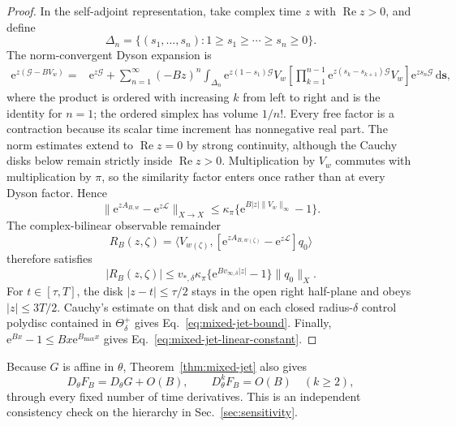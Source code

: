 \documentclass[aps,physrev,onecolumn,amsmath,amssymb,longbibliography]{revtex4-2}
\newcommand{\dd}{\mathrm d}
\newcommand{\e}{\mathrm e}
\newcommand{\Lfree}{\mathcal L}
\begin{document}
\begin{proof}
In the self-adjoint representation, take complex time \(z\) with
\(\operatorname{Re}z>0\), and define
\begin{equation}
 \Delta_n=\{(s_1,\ldots,s_n):1\ge s_1\ge\cdots\ge s_n\ge0\}.
 \label{eq:ordered-simplex}
\end{equation}
The norm-convergent Dyson expansion is
\begin{align}
 \e^{z(\mathcal G-BV_w)}
 ={}&\e^{z\mathcal G}
 +\sum_{n=1}^{\infty}(-Bz)^n
 \int_{\Delta_n}\e^{z(1-s_1)\mathcal G}V_w
 \left[\prod_{k=1}^{n-1}
 \e^{z(s_k-s_{k+1})\mathcal G}V_w\right]
 \e^{zs_n\mathcal G}\,\dd\bm s,
 \label{eq:dyson}
\end{align}
where the product is ordered with increasing \(k\) from left to right and is
the identity for \(n=1\); the ordered simplex has volume
\(1/n!\).  Every free factor is a contraction because its scalar time
increment has nonnegative real part.  The norm estimates extend to
\(\operatorname{Re}z=0\) by strong continuity, although the Cauchy disks below
remain strictly inside \(\operatorname{Re}z>0\).  Multiplication by \(V_w\)
commutes with multiplication by
\(\pi\), so the similarity factor enters once rather than at every Dyson
factor.  Hence
\begin{equation}
 \|\e^{zA_{B,w}}-\e^{z\Lfree}\|_{X\to X}
 \le\kappa_\pi\{\e^{B|z|\|V_w\|_\infty}-1\}.
 \label{eq:dyson-operator-bound}
\end{equation}
The complex-bilinear observable remainder
\begin{equation}
 R_B(z,\zeta)=
 \langle V_{w(\zeta)},
 [\e^{zA_{B,w(\zeta)}}-\e^{z\Lfree}]q_0\rangle
 \label{eq:analytic-remainder}
\end{equation}
therefore satisfies
\begin{equation}
 |R_B(z,\zeta)|
 \le v_{*,\delta}\kappa_\pi
 \{\e^{Bv_{\infty,\delta}|z|}-1\}\|q_0\|_X.
 \label{eq:analytic-remainder-bound}
\end{equation}
For \(t\in[\tau,T]\), the disk \(|z-t|\le\tau/2\) stays in the open right
half-plane and obeys \(|z|\le3T/2\).  Cauchy's estimate on that disk and on
each closed radius-\(\delta\) control polydisc contained in
\(\Theta_\delta^+\) gives Eq.~\eqref{eq:mixed-jet-bound}.  Finally,
\(\e^{Bx}-1\le Bx\e^{B_{\max}x}\) gives
Eq.~\eqref{eq:mixed-jet-linear-constant}.
\end{proof}

Because \(G\) is affine in \(\theta\), Theorem~\ref{thm:mixed-jet} also gives
\begin{equation}
 D_\theta F_B=D_\theta G+O(B),
 \qquad D_\theta^kF_B=O(B)\quad(k\ge2),
 \label{eq:control-order-check}
\end{equation}
through every fixed number of time derivatives.  This is an independent
consistency check on the hierarchy in Sec.~\ref{sec:sensitivity}.
\end{document}
